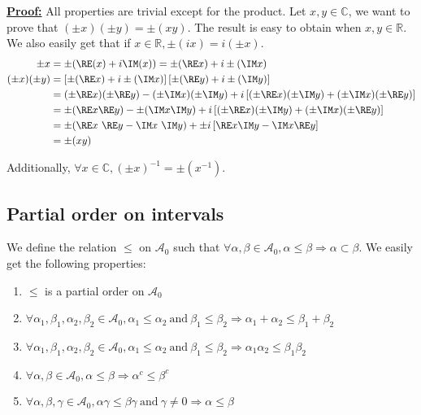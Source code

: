 \noindent\underline{\textbf{Proof:}} All properties are trivial except for the product. Let $x, y \in \mathbb{C}$, we want to prove that $(\pm x)(\pm y) = \pm (xy)$. The result is easy to obtain when $x, y \in \mathbb{R}$.
We also easily get that if $x \in \mathbb{R}, \pm (ix) = i(\pm x)$.
\begin{align*}
    \pm x &= \pm(\RE(x) + i\IM(x)) = \pm(\RE x) + i \pm(\IM x) \\
    (\pm x)(\pm y) &= \left[\pm(\RE x) + i \pm(\IM x)\right] \left[\pm(\RE y) + i \pm(\IM y)\right] \\
    &= (\pm \RE x) (\pm \RE y) - (\pm \IM x) (\pm \IM y) + i \left[(\pm \RE x)(\pm \IM y) + (\pm \IM x) (\pm \RE y)\right] \\
    &= \pm (\RE x \RE y) - \pm(\IM x \IM y) + i \left[(\pm \RE x)(\pm \IM y) + (\pm \IM x) (\pm \RE y)\right] \\
    &= \pm(\RE x~\RE y - \IM x~\IM y) + \pm i \left[\RE x \IM y - \IM x \RE y\right] \\
    &= \pm (xy)
\end{align*}

Additionally, $\forall x \in \mathbb{C}, (\pm x)^{-1} = \pm (x^{-1})$.

\subsection{Partial order on intervals}

We define the relation $\le$ on $\mathcal{A}_0$ such that $\forall \alpha, \beta \in \mathcal{A}_0, \alpha \le \beta \Rightarrow \alpha \subset \beta$.
We easily get the following properties:
\begin{enumerate}[i]
    \item $\le$ is a partial order on $\mathcal{A}_0$
    \item $\forall \alpha_1, \beta_1, \alpha_2, \beta_2 \in \mathcal{A}_0, \alpha_1 \le \alpha_2 ~\text{and}~ \beta_1 \le \beta_2 \Rightarrow \alpha_1 + \alpha_2 \le \beta_1 + \beta_2$
    \item $\forall \alpha_1, \beta_1, \alpha_2, \beta_2 \in \mathcal{A}_0, \alpha_1 \le \alpha_2 ~\text{and}~ \beta_1 \le \beta_2 \Rightarrow \alpha_1 \alpha_2 \le \beta_1 \beta_2$
    \item $\forall \alpha, \beta \in \mathcal{A}_0, \alpha \le \beta \Rightarrow \alpha^c \le \beta^c$
    \item $\forall \alpha, \beta, \gamma \in \mathcal{A}_0, \alpha \gamma \le \beta \gamma ~\text{and}~ \gamma \not=0 \Rightarrow \alpha \le \beta$
\end{enumerate}

